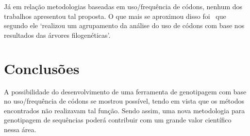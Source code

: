 \documentclass[12pt]{article}
\begin{document}
Já em relação metodologias baseadas em uso/frequência de códons, nenhum dos trabalhos apresentou tal proposta. O que mais se aproximou disso foi~\cite{cho_analysis_2022} que segundo ele `realizou um agrupamento da análise do uso de códons com base nos resultados das árvores filogenéticas'.

\section{Conclusões}

A possibilidade do desenvolvimento de uma ferramenta de genotipagem com base no uso/frequência de códons se mostrou possível, tendo em vista que os métodos encontrados não realizavam tal função. Sendo assim, uma nova metodologia para genotipagem de sequências poderá contribuir com um grande valor científico nessa área.



\end{document}
